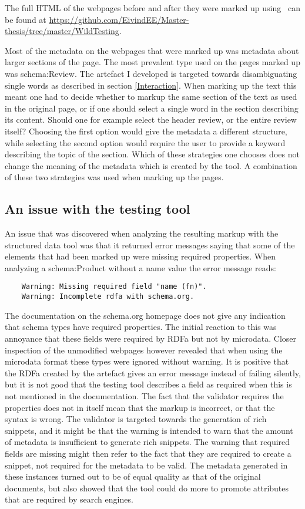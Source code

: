 The full HTML of the webpages before and after they were marked up using \theartefact\ can be found at
\url{https://github.com/EivindEE/Master-thesis/tree/master/WildTesting}.

Most of the metadata on the webpages that were marked up was metadata about larger sections of the page.
The most prevalent type used on the pages marked up was schema:Review.
The artefact I developed is targeted towards disambiguating single words as described in section \ref{Interaction}.
When marking up the text this meant one had to decide whether to markup the same section of the text as used in the original page,
or if one should select a single word in the section describing its content.
Should one for example select the header review, or the entire review itself?
Choosing the first option would give the metadata a different structure,
while selecting the second option would require the user to provide a keyword describing the topic of the section.
Which of these strategies one chooses does not change the meaning of the metadata which is created by the tool.
A combination of these two strategies was used when marking up the pages.

\subsection{An issue with the testing tool}
An issue that was discovered when analyzing the resulting markup with the structured data tool was that
it returned  error messages saying that some of the elements that had been marked up were missing required properties.
When analyzing a schema:Product without a name value the error message reads:

\begin{verbatim}
	Warning: Missing required field "name (fn)".
	Warning: Incomplete rdfa with schema.org.
\end{verbatim}

The documentation on the schema.org homepage does not give any indication that schema types have required properties.
The initial reaction to this was annoyance that these fields were required by RDFa but not by microdata.
Closer inspection of the unmodified webpages however revealed that when using the microdata format these types
were ignored without warning.
It is positive that the RDFa created by the artefact gives an error message instead of failing silently,
but it is not good that the testing tool describes a field as required when this is not mentioned in the documentation.
The fact that the validator requires the properties does not in itself mean that the markup is incorrect,
or that the syntax is wrong.
The validator is targeted towards the generation of rich snippets,
and it might be that the warning is intended to warn that the amount of metadata is insufficient to generate rich snippets.
The warning that required fields are missing might then refer to the fact that they are required to create a snippet,
not required for the metadata to be valid.
The metadata generated in these instances turned out to be of equal quality as that of the original documents,
but also showed that the tool could do more to promote attributes that are required by search engines.

